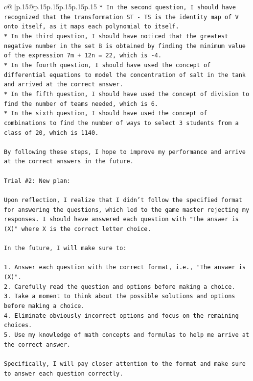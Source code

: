 \documentclass{article}
\begin{document}
{\begin{supertabular}{c@{$\;$}|p{.15\linewidth}@{}p{.15\linewidth}p{.15\linewidth}p{.15\linewidth}p{.15\linewidth}p{.15\linewidth}}
{{{\texttt{* In the second question, I should have recognized that the transformation ST {-} TS is the identity map of V onto itself, as it maps each polynomial to itself.} \\
\texttt{* In the third question, I should have noticed that the greatest negative number in the set B is obtained by finding the minimum value of the expression 7m + 12n = 22, which is {-}4.} \\
\texttt{* In the fourth question, I should have used the concept of differential equations to model the concentration of salt in the tank and arrived at the correct answer.} \\
\texttt{* In the fifth question, I should have used the concept of division to find the number of teams needed, which is 6.} \\
\texttt{* In the sixth question, I should have used the concept of combinations to find the number of ways to select 3 students from a class of 20, which is 1140.} \\
\\ 
\texttt{By following these steps, I hope to improve my performance and arrive at the correct answers in the future.} \\
\\ 
\texttt{Trial \#2: New plan: } \\
\\ 
\texttt{Upon reflection, I realize that I didn't follow the specified format for answering the questions, which led to the game master rejecting my responses. I should have answered each question with "The answer is (X)" where X is the correct letter choice.} \\
\\ 
\texttt{In the future, I will make sure to:} \\
\\ 
\texttt{1. Answer each question with the correct format, i.e., "The answer is (X)".} \\
\texttt{2. Carefully read the question and options before making a choice.} \\
\texttt{3. Take a moment to think about the possible solutions and options before making a choice.} \\
\texttt{4. Eliminate obviously incorrect options and focus on the remaining choices.} \\
\texttt{5. Use my knowledge of math concepts and formulas to help me arrive at the correct answer.} \\
\\ 
\texttt{Specifically, I will pay closer attention to the format and make sure to answer each question correctly.} \\
}}}
\end{supertabular}}
\end{document}
